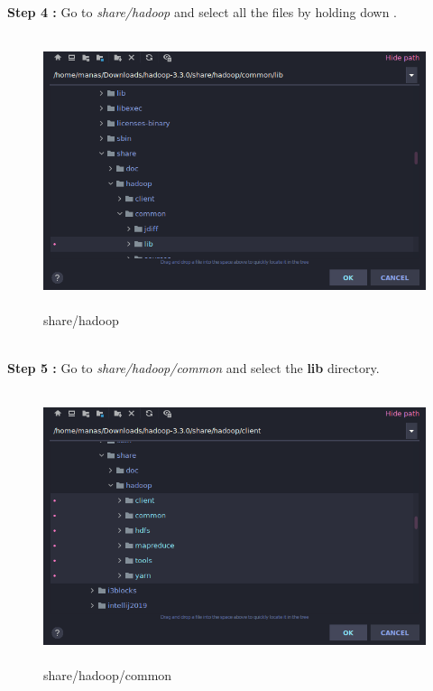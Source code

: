 \documentclass[10pt]{report}
\begin{document}
\textbf{Step 4 :} Go to \textit{share/hadoop} and select all the files by holding down \keys{\shift}.
\begin{figure}[h]
        \includegraphics[height=8cm]{dependency1.png}
        \centering
        \caption{share/hadoop}
        \centering
\end{figure}
\\

\textbf{Step 5 :} Go to \textit{share/hadoop/common} and select the \textbf{lib} directory.
\begin{figure}[h]
        \includegraphics[height=8cm]{dependency2.png}
        \centering
        \caption{share/hadoop/common}
        \centering
\end{figure}
\clearpage
\end{document}
